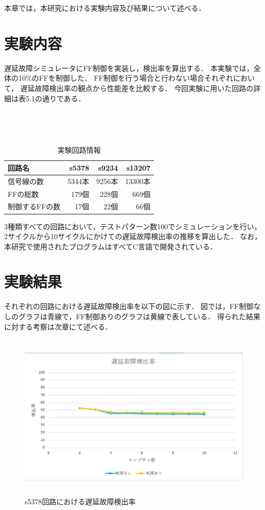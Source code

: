本章では，本研究における実験内容及び結果について述べる．

\section{実験内容}
遅延故障シミュレータにFF制御を実装し，検出率を算出する．
本実験では，全体の10\%のFFを制御した．
FF制御を行う場合と行わない場合それぞれにおいて，
遅延故障検出率の観点から性能差を比較する．
今回実験に用いた回路の詳細は表5.1の通りである．
\begin{table}[htb]
　\begin{center}
　\caption{実験回路情報}
  \begin{tabular}{|l|r|r|r|} \hline
    回路名 & s5378 & s9234 & s13207 \\ \hline \hline
    信号線の数 & 5344本 & 9256本 & 13300本 \\
    FFの総数 & 179個 & 228個 & 669個 \\
    制御するFFの数 & 17個 & 22個 & 66個 \\ \hline
  \end{tabular}
  \end{center}
\end{table}

3種類すべての回路において，テストパターン数100でシミュレーションを行い，
2サイクルから10サイクルにかけての遅延故障検出率の推移を算出した．
なお，本研究で使用されたプログラムはすべてC言語で開発されている．

\section{実験結果}
それぞれの回路における遅延故障検出率を以下の図に示す．
図では，FF制御なしのグラフは青線で，FF制御ありのグラフは黄線で表している．
得られた結果に対する考察は次章にて述べる．

\begin{figure}[h]
\begin{center}
	\includegraphics[height=80mm]{s5378CPI.eps}
	\caption{s5378回路における遅延故障検出率}
\end{center}
\end{figure}

